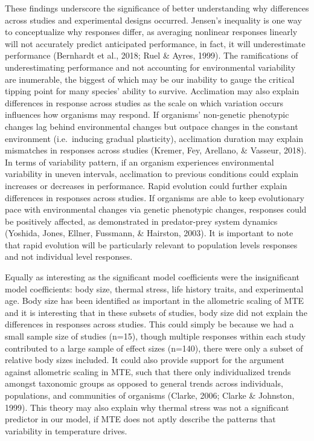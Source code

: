 \documentclass[12pt,twoside]{reedthesis}
\begin{document}
These findings underscore the significance of better understanding why differences across studies and experimental designs occurred. Jensen's inequality is one way to conceptualize why responses differ, as averaging nonlinear responses linearly will not accurately predict anticipated performance, in fact, it will underestimate performance (Bernhardt et al., 2018; Ruel \& Ayres, 1999). The ramifications of underestimating performance and not accounting for environmental variability are inumerable, the biggest of which may be our inability to gauge the critical tipping point for many species' ability to survive. Acclimation may also explain differences in response across studies as the scale on which variation occurs influences how organisms may respond. If organisms' non-genetic phenotypic changes lag behind environmental changes but outpace changes in the constant environment (i.e.~inducing gradual plasticity), acclimation duration may explain mismatches in responses across studies (Kremer, Fey, Arellano, \& Vasseur, 2018). In terms of variability pattern, if an organism experiences environmental variability in uneven intervals, acclimation to previous conditions could explain increases or decreases in performance. Rapid evolution could further explain differences in responses across studies. If organisms are able to keep evolutionary pace with environmental changes via genetic phenotypic changes, responses could be positively affected, as demonstrated in predator-prey system dynamics (Yoshida, Jones, Ellner, Fussmann, \& Hairston, 2003). It is important to note that rapid evolution will be particularly relevant to population levels responses and not individual level responses.

Equally as interesting as the significant model coefficients were the insignificant model coefficients: body size, thermal stress, life history traits, and experimental age. Body size has been identified as important in the allometric scaling of MTE and it is interesting that in these subsets of studies, body size did not explain the differences in responses across studies. This could simply be because we had a small sample size of studies (n=15), though multiple responses within each study contributed to a large sample of effect sizes (n=140), there were only a subset of relative body sizes included. It could also provide support for the argument against allometric scaling in MTE, such that there only individualized trends amongst taxonomic groups as opposed to general trends across individuals, populations, and communities of organisms (Clarke, 2006; Clarke \& Johnston, 1999). This theory may also explain why thermal stress was not a significant predictor in our model, if MTE does not aptly describe the patterns that variability in temperature drives.
\end{document}
